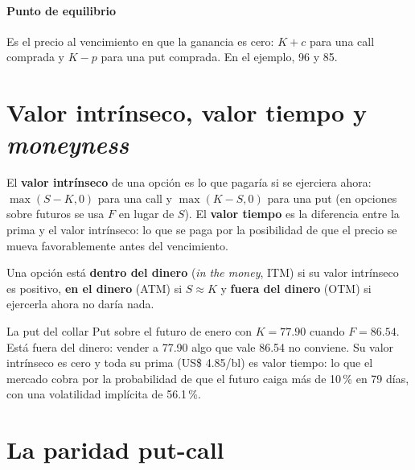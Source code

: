 
\paragraph{Punto de equilibrio} Es el precio al vencimiento en que la ganancia es cero: $K+c$ para una call comprada y $K-p$ para una put comprada. En el ejemplo, 96 y 85.

\section{Valor intrínseco, valor tiempo y \emph{moneyness}}

\begin{definicion}
El \textbf{valor intrínseco} de una opción es lo que pagaría si se ejerciera ahora: $\max(S-K,0)$ para una call y $\max(K-S,0)$ para una put (en opciones sobre futuros se usa $F$ en lugar de $S$). El \textbf{valor tiempo} es la diferencia entre la prima y el valor intrínseco: lo que se paga por la posibilidad de que el precio se mueva favorablemente antes del vencimiento.
\end{definicion}

\begin{definicion}
Una opción está \textbf{dentro del dinero} (\emph{in the money}, ITM) si su valor intrínseco es positivo, \textbf{en el dinero} (ATM) si $S\approx K$ y \textbf{fuera del dinero} (OTM) si ejercerla ahora no daría nada.
\end{definicion}

\begin{ejemplo}{La put del collar}
Put sobre el futuro de enero con $K=77.90$ cuando $F=86.54$. Está fuera del dinero: vender a 77.90 algo que vale 86.54 no conviene. Su valor intrínseco es cero y toda su prima (US\$ 4.85/bl) es valor tiempo: lo que el mercado cobra por la probabilidad de que el futuro caiga más de 10\,\% en 79 días, con una volatilidad implícita de 56.1\,\%.
\end{ejemplo}

\section{La paridad put-call}

